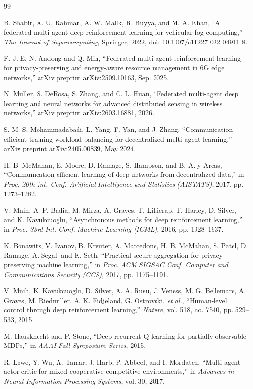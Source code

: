 \documentclass[12pt,a4paper,final]{extreport}
\begin{document}
\begingroup
{}
\begin{thebibliography}{99}

B. Shabir, A. U. Rahman, A. W. Malik, R. Buyya, and M. A. Khan, ``A federated multi-agent deep reinforcement learning for vehicular fog computing,'' \textit{The Journal of Supercomputing}, Springer, 2022, doi: 10.1007/s11227-022-04911-8.

F. J. E. N. Andong and Q. Min, ``Federated multi-agent reinforcement learning for privacy-preserving and energy-aware resource management in 6G edge networks,'' arXiv preprint arXiv:2509.10163, Sep. 2025.

N. Muller, S. DeRosa, S. Zhang, and C. L. Huan, ``Federated multi-agent deep learning and neural networks for advanced distributed sensing in wireless networks,'' arXiv preprint arXiv:2603.16881, 2026.

S. M. S. Mohammadabadi, L. Yang, F. Yan, and J. Zhang, ``Communication-efficient training workload balancing for decentralized multi-agent learning,'' arXiv preprint arXiv:2405.00839, May 2024.

H. B. McMahan, E. Moore, D. Ramage, S. Hampson, and B. A. y Arcas, ``Communication-efficient learning of deep networks from decentralized data,'' in \textit{Proc. 20th Int. Conf. Artificial Intelligence and Statistics (AISTATS)}, 2017, pp. 1273--1282.

V. Mnih, A. P. Badia, M. Mirza, A. Graves, T. Lillicrap, T. Harley, D. Silver, and K. Kavukcuoglu, ``Asynchronous methods for deep reinforcement learning,'' in \textit{Proc. 33rd Int. Conf. Machine Learning (ICML)}, 2016, pp. 1928--1937.

K. Bonawitz, V. Ivanov, B. Kreuter, A. Marcedone, H. B. McMahan, S. Patel, D. Ramage, A. Segal, and K. Seth, ``Practical secure aggregation for privacy-preserving machine learning,'' in \textit{Proc. ACM SIGSAC Conf. Computer and Communications Security (CCS)}, 2017, pp. 1175--1191.

V. Mnih, K. Kavukcuoglu, D. Silver, A. A. Rusu, J. Veness, M. G. Bellemare, A. Graves, M. Riedmiller, A. K. Fidjeland, G. Ostrovski, \textit{et al.}, ``Human-level control through deep reinforcement learning,'' \textit{Nature}, vol. 518, no. 7540, pp. 529--533, 2015.

M. Hausknecht and P. Stone, ``Deep recurrent Q-learning for partially observable MDPs,'' in \textit{AAAI Fall Symposium Series}, 2015.

R. Lowe, Y. Wu, A. Tamar, J. Harb, P. Abbeel, and I. Mordatch, ``Multi-agent actor-critic for mixed cooperative-competitive environments,'' in \textit{Advances in Neural Information Processing Systems}, vol. 30, 2017.

\end{thebibliography}
\endgroup
\end{document}
